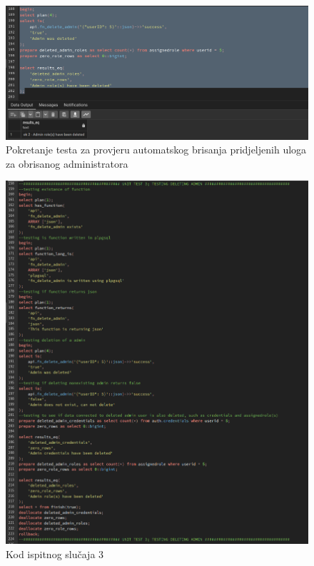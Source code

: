 				\begin{figure}[H]
					\centering
					\includegraphics[width=\textwidth]{slike/unit_tests/ut_3/role_deletion.png}
					\caption{Pokretanje testa za provjeru automatskog brisanja pridjeljenih uloga za obrisanog administratora}
					\label{fig: IS3-brisanje pridjeljenih uloga za obrisanog administratora}
				\end{figure}
				\begin{figure}[H]
					\centering
					\includegraphics[width=\textwidth]{slike/unit_tests/ut_3/code.png}
					\caption{Kod ispitnog slučaja 3}
					\label{fig: IS3-kod}
				\end{figure}
				\eject
